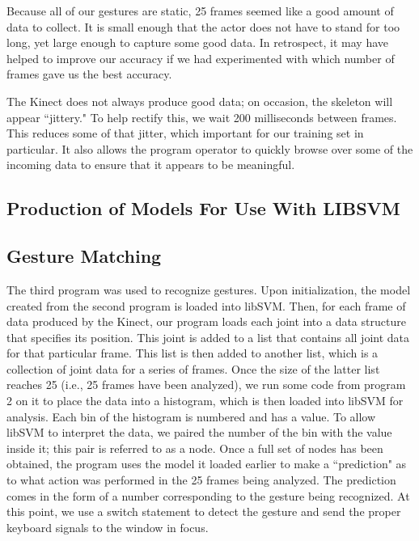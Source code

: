 \documentclass[11pt,conference]{IEEEtran}
\begin{document}
Because all of our gestures are static, 25 frames seemed like a good amount of data to collect. It is small enough that the actor does not have to stand for too long, yet large enough to capture some good data. In retrospect, it may have helped to improve our accuracy if we had experimented with which number of frames gave us the best accuracy.

The Kinect does not always produce good data; on occasion, the skeleton will appear ``jittery." To help rectify this, we wait 200 milliseconds between frames. This reduces some of that jitter, which important for our training set in particular. It also allows the program operator to quickly browse over some of the incoming data to ensure that it appears to be meaningful.

\subsection{Production of Models For Use With LIBSVM}

\subsection{Gesture Matching}
The third program was used to recognize gestures. Upon initialization, the model created from the second program is loaded into libSVM. Then, for each frame of data produced by the Kinect, our program loads each joint into a data structure that specifies its position. This joint is added to a list that contains all joint data for that particular frame. This list is then added to another list, which is a collection of joint data for a series of frames. Once the size of the latter list reaches 25 (i.e., 25 frames have been analyzed), we run some code from program 2 on it to place the data into a histogram, which is then loaded into libSVM for analysis. Each bin of the histogram is numbered and has a value. To allow libSVM to interpret the data, we paired the number of the bin with the value inside it; this pair is referred to as a node. Once a full set of nodes has been obtained, the program uses the model it loaded earlier to make a ``prediction" as to what action was performed in the 25 frames being analyzed. The prediction comes in the form of a number corresponding to the gesture being recognized. At this point, we use a switch statement to detect the gesture and send the proper keyboard signals to the window in focus.
\end{document}
